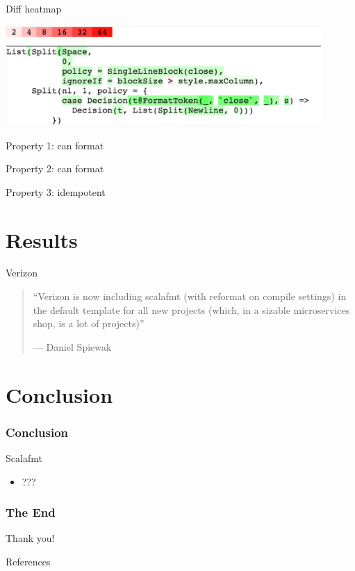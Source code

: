 \documentclass[xcolor=dvipsnames]{beamer}
\theoremstyle{definition}
\begin{document}
\begin{frame}{Diff heatmap}
  \begin{center}
    \includegraphics[width=0.9\textwidth]{img/heatmap2.png}
  \end{center}
\end{frame}

\begin{frame}{Property 1: can format}
  
\end{frame}

\begin{frame}{Property 2: can format}
  
\end{frame}

\begin{frame}{Property 3: idempotent}
  
\end{frame}


\section{Results} %
\label{sec:Results}

\begin{frame}{Verizon}
  \begin{quote}
    ``Verizon is now including scalafmt (with reformat on compile settings) in
    the default template for all new projects (which, in a sizable
    microservices shop, is a lot of projects)''

    \hfill --- Daniel Spiewak
  \end{quote}
\end{frame}

\section{Conclusion} %
\label{sec:Conclusion}

\begin{frame}[fragile]
  \frametitle{Conclusion}
    \begin{block}{Scalafmt}
      \begin{itemize}
        \item ???
      \end{itemize}
    \end{block}
\end{frame}

\begin{frame}[fragile]
  \frametitle{The End}
    \begin{center}
      \Huge
        Thank you!
    \end{center}
\end{frame}

\begin{frame}{References}
  \printbibliography{}
\end{frame}

\end{document}
